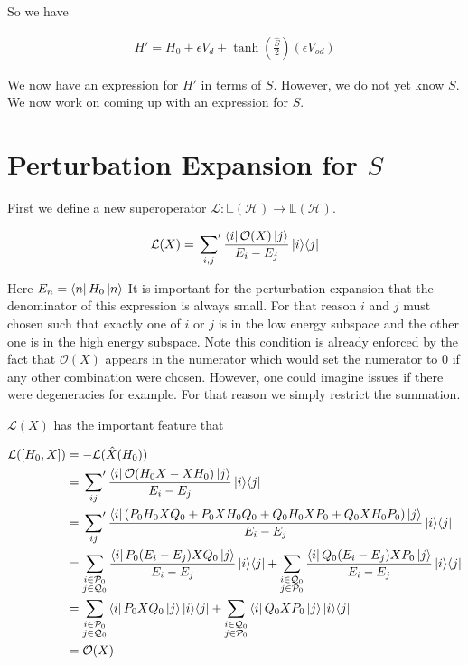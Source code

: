 \documentclass[12pt]{article}
\newcommand{\ketbra}[2]{\Ket{#1}\!\Bra{#2}}
\begin{document}
So we have

\begin{align}
H' = H_0 + \epsilon V_d + \tanh\left(\frac{\hat{S}}{2}\right)(\epsilon V_{od})
\end{align}

We now have an expression for $H'$ in terms of $S$. However, we do not yet know $S$. We now work on coming up with an expression for $S$.

\section{Perturbation Expansion for $S$}

First we define a new superoperator $\mathcal{L}:\mathbb{L}(\mathcal{H})\rightarrow\mathbb{L}(\mathcal{H})$.

\begin{align}
\mathcal{L}(X) = \sideset{}{'}\sum_{i,j} \frac{\bra{i}\mathcal{O}(X)\ket{j}}{E_i - E_j} \ketbra{i}{j}
\end{align}

Here $E_n = \bra{n}H_0\ket{n}$ It is important for the perturbation expansion that the denominator of this expression is always small. For that reason $i$ and $j$ must chosen such that exactly one of $i$ or $j$ is in the low energy subspace and the other one is in the high energy subspace. Note this condition is already enforced by the fact that $\mathcal{O}(X)$ appears in the numerator which would set the numerator to $0$ if any other combination were chosen. However, one could imagine issues if there were degeneracies for example. For that reason we simply restrict the summation.

$\mathcal{L}(X)$ has the important feature that

\begin{equation}
\begin{split}
\mathcal{L}([H_0,X]) &= -\mathcal{L}(\hat{X}(H_0))\\
&= \sideset{}{'}\sum_{ij} \frac{\bra{i}\mathcal{O}(H_0X-XH_0)\ket{j}}{E_i - E_j} \ketbra{i}{j}\\
&= \sideset{}{'}\sum_{ij} \frac{\bra{i}(P_0H_0XQ_0 + P_0XH_0Q_0 + Q_0H_0XP_0 + Q_0XH_0P_0)\ket{j}}{E_i-E_j}\ketbra{i}{j}\\
&= \sum_{\substack{i\in\mathcal{P}_0 \\ j\in\mathcal{Q}_0}} \frac{\bra{i}P_0(E_i-E_j)XQ_0\ket{j}}{E_i-E_j} \ketbra{i}{j} + \sum_{\substack{i\in\mathcal{Q}_0 \\ j\in\mathcal{P}_0}} \frac{\bra{i}Q_0(E_i-E_j)XP_0\ket{j}}{E_i-E_j} \ketbra{i}{j}\\
&=\sum_{\substack{i\in\mathcal{P}_0 \\ j\in\mathcal{Q}_0}} \bra{i}P_0XQ_0\ket{j} \ketbra{i}{j} + \sum_{\substack{i\in\mathcal{Q}_0 \\ j\in\mathcal{P}_0}} \bra{i}Q_0XP_0\ket{j} \ketbra{i}{j}\\
&= \mathcal{O}(X)
\end{split}
\end{equation}
\end{document}
